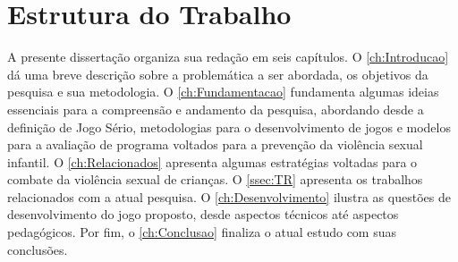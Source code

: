 
\section{Estrutura do Trabalho}\label{ch:Estrutura}

A presente dissertação organiza sua redação em seis capítulos. O \autoref{ch:Introducao} dá uma breve descrição sobre a problemática a ser abordada, os objetivos da pesquisa e sua metodologia. O \autoref{ch:Fundamentacao} fundamenta algumas ideias essenciais para a compreensão e andamento da pesquisa, abordando desde a definição de Jogo Sério, metodologias para o desenvolvimento de jogos e modelos para a avaliação de programa voltados para a prevenção da violência sexual infantil. O \autoref{ch:Relacionados} apresenta algumas estratégias voltadas para o combate da violência sexual de crianças. O \autoref{ssec:TR} apresenta os trabalhos relacionados com a atual pesquisa. O \autoref{ch:Desenvolvimento} ilustra as questões de desenvolvimento do jogo proposto, desde aspectos técnicos até aspectos pedagógicos. %
Por fim, o \autoref{ch:Conclusao} finaliza o atual estudo com suas conclusões.






